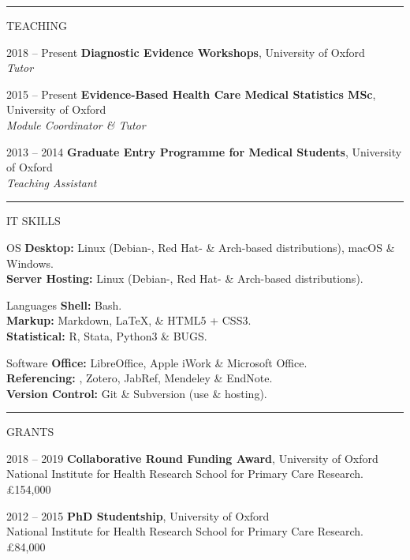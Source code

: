 \documentclass[10pt,a4paper]{article}
\begin{document}
\noindent\rule{\textwidth}{0.4pt}
\begin{cvlist}{TEACHING}
  
  \item[2018 -- Present]
  \textbf{Diagnostic Evidence Workshops}, University of Oxford \\
  \textit{Tutor}
  
  \item[2015 -- Present]
  \textbf{Evidence-Based Health Care Medical Statistics MSc}, University of Oxford \\
  \textit{Module Coordinator \& Tutor}
  
  \item[2013 -- 2014]
  \textbf{Graduate Entry Programme for Medical Students}, University of Oxford \\
  \textit{Teaching Assistant}
  
\end{cvlist}


\noindent\rule{\textwidth}{0.4pt}
\begin{cvlist}{IT SKILLS}

  \item[OS]
  \textbf{Desktop:} Linux (Debian-, Red Hat- \& Arch-based distributions), macOS \& Windows. \\
  \textbf{Server Hosting:} Linux (Debian-, Red Hat- \& Arch-based distributions).
  
  \item[Languages]
  \textbf{Shell:} Bash. \\
  \textbf{Markup:} Markdown, \LaTeX , \& HTML5 + CSS3. \\
  \textbf{Statistical:} R, Stata, Python3 \& BUGS.
  
  \item[Software]
  \textbf{Office:} LibreOffice, Apple iWork \& Microsoft Office. \\
  \textbf{Referencing:} , Zotero, JabRef, Mendeley \& EndNote. \\
  \textbf{Version Control:} Git \& Subversion (use \& hosting).
  
\end{cvlist}


\noindent\rule{\textwidth}{0.4pt}
\begin{cvlist}{GRANTS}
  
  \item[2018 -- 2019]
  \textbf{Collaborative Round Funding Award}, University of Oxford \\
  National Institute for Health Research School for Primary Care Research. \\
  \pounds 154,000
  
  \item[2012 -- 2015]
  \textbf{PhD Studentship}, University of Oxford \\
  National Institute for Health Research School for Primary Care Research. \\
  \pounds 84,000
  
\end{cvlist}
\end{document}
